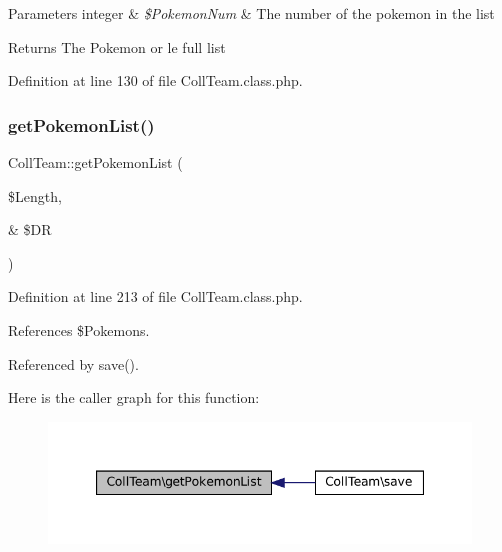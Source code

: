\begin{DoxyParams}[1]{Parameters}
integer & {\em \$\+Pokemon\+Num} & The number of the pokemon in the list \\
\hline
\end{DoxyParams}
\begin{DoxyReturn}{Returns}
The Pokemon or le full list 
\end{DoxyReturn}


Definition at line 130 of file Coll\+Team.\+class.\+php.

\mbox{\label{class_coll_team_ab2e2067144092a1873ddafe1532d14a1}} 
\subsubsection{\texorpdfstring{get\+Pokemon\+List()}{getPokemonList()}}
{\footnotesize\ttfamily Coll\+Team\+::get\+Pokemon\+List (\begin{DoxyParamCaption}\item[{}]{\$\+Length,  }\item[{\&}]{\$\+DR }\end{DoxyParamCaption})\hspace{0.3cm}{\ttfamily [protected]}}



Definition at line 213 of file Coll\+Team.\+class.\+php.



References \$\+Pokemons.



Referenced by save().

Here is the caller graph for this function\+:\nopagebreak
\begin{figure}[H]
\begin{center}
\leavevmode
\includegraphics[width=347pt]{class_coll_team_ab2e2067144092a1873ddafe1532d14a1_icgraph}
\end{center}
\end{figure}
\mbox{\label{class_coll_team_a211b8c10a766e5063fd8f2cb0489e9e8}} 
